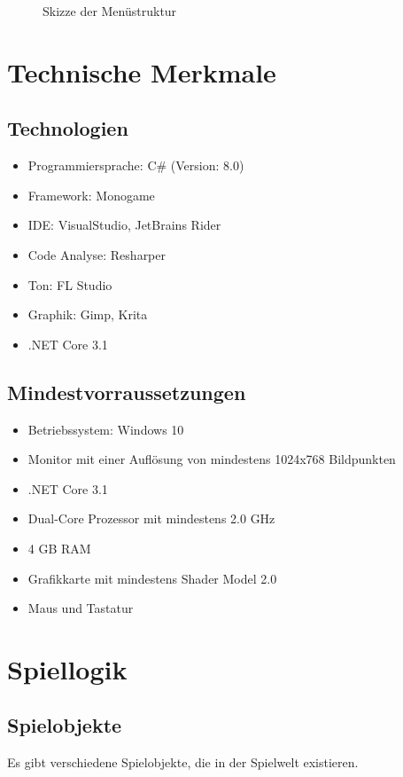 \documentclass[a4paper,
  twoside, %
  headlines=2.1 %
  ]{scrartcl}
\begin{document}
	    \begin{figure}[H]
	        \centering
	        \caption{Skizze der Menüstruktur}
	        \label{pic:Menu}
	    \end{figure}
	   

\section{Technische Merkmale}
	\subsection{Technologien}
	\begin{itemize}
	    \item Programmiersprache: C\# (Version: 8.0)
	    \item Framework: Monogame
	    \item IDE: VisualStudio, JetBrains Rider
	    \item Code Analyse: Resharper
	    \item Ton: FL Studio
	    \item Graphik: Gimp, Krita
	    \item .NET Core 3.1
	\end{itemize}
	\subsection{Mindestvorraussetzungen}
    \begin{itemize}
					\item Betriebssystem: Windows 10
					\item Monitor mit einer Auflösung von mindestens 1024x768 Bildpunkten
					\item .NET Core 3.1
					\item Dual-Core Prozessor mit mindestens 2.0 GHz
					\item 4 GB RAM
					\item Grafikkarte mit mindestens Shader Model 2.0
					\item Maus und Tastatur
	\end{itemize}
\section{Spiellogik}
	\subsection{Spielobjekte}
	Es gibt verschiedene Spielobjekte, die in der Spielwelt existieren.
\end{document}
